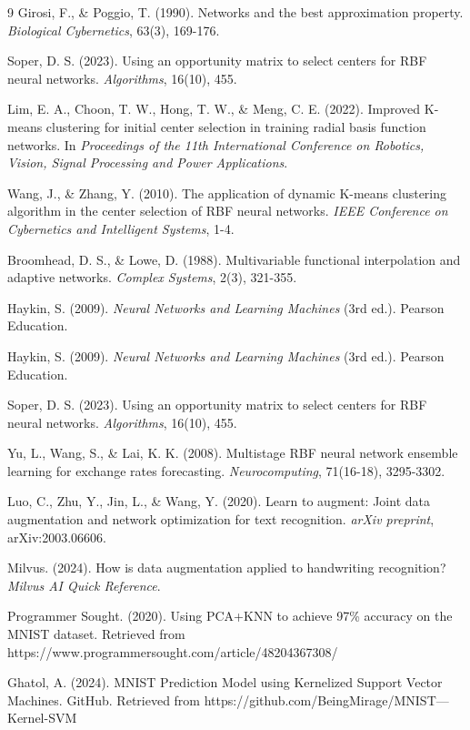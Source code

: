 \documentclass[12pt]{article}
\begin{document}
\begin{thebibliography}{9}
		 Girosi, F., \& Poggio, T. (1990). Networks and the best approximation property. \textit{Biological Cybernetics}, 63(3), 169-176.
		
		 Soper, D. S. (2023). Using an opportunity matrix to select centers for RBF neural networks. \textit{Algorithms}, 16(10), 455.
		
		 Lim, E. A., Choon, T. W., Hong, T. W., \& Meng, C. E. (2022). Improved K-means clustering for initial center selection in training radial basis function networks. In \textit{Proceedings of the 11th International Conference on Robotics, Vision, Signal Processing and Power Applications}.
		
		 Wang, J., \& Zhang, Y. (2010). The application of dynamic K-means clustering algorithm in the center selection of RBF neural networks. \textit{IEEE Conference on Cybernetics and Intelligent Systems}, 1-4.
		
		 Broomhead, D. S., \& Lowe, D. (1988). Multivariable functional interpolation and adaptive networks. \textit{Complex Systems}, 2(3), 321-355.
		
		 Haykin, S. (2009). \textit{Neural Networks and Learning Machines} (3rd ed.). Pearson Education.
		
		 Haykin, S. (2009). \textit{Neural Networks and Learning Machines} (3rd ed.). Pearson Education.
		
		 Soper, D. S. (2023). Using an opportunity matrix to select centers for RBF neural networks. \textit{Algorithms}, 16(10), 455.
		
		 Yu, L., Wang, S., \& Lai, K. K. (2008). Multistage RBF neural network ensemble learning for exchange rates forecasting. \textit{Neurocomputing}, 71(16-18), 3295-3302.
		
		 Luo, C., Zhu, Y., Jin, L., \& Wang, Y. (2020). Learn to augment: Joint data augmentation and network optimization for text recognition. \textit{arXiv preprint}, arXiv:2003.06606.
		
		 Milvus. (2024). How is data augmentation applied to handwriting recognition? \textit{Milvus AI Quick Reference}.
		
		 Programmer Sought. (2020). Using PCA+KNN to achieve 97\% accuracy on the MNIST dataset. Retrieved from https://www.programmersought.com/article/48204367308/
		
		 Ghatol, A. (2024). MNIST Prediction Model using Kernelized Support Vector Machines. GitHub. Retrieved from https://github.com/BeingMirage/MNIST---Kernel-SVM
		

\end{thebibliography}
\end{document}
